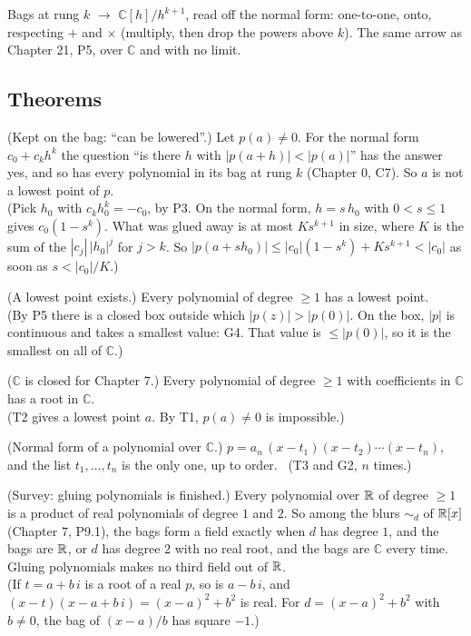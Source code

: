 \begin{lines}
\item[\lab{P6}] Bags at rung $k$ $\to$ $\mathbb{C}[h]/h^{k+1}$, read off the normal form: one-to-one, onto, respecting $+$ and $\times$ (multiply, then drop the powers above $k$). The same arrow as Chapter 21, P5, over $\mathbb{C}$ and with no limit.
\end{lines}

\subsection*{Theorems}

\begin{lines}
\item[\lab{T1}] (Kept on the bag: ``can be lowered''.) Let $p(a) \neq 0$. For the normal form $c_0 + c_k h^k$ the question ``is there $h$ with $|p(a + h)| < |p(a)|$'' has the answer yes, and so has every polynomial in its bag at rung $k$ (Chapter 0, C7). So $a$ is not a lowest point of $p$. \\
(Pick $h_0$ with $c_k h_0^k = -c_0$, by P3. On the normal form, $h = s\,h_0$ with $0 < s \le 1$ gives $c_0(1 - s^k)$. What was glued away is at most $K s^{k+1}$ in size, where $K$ is the sum of the $|c_j|\,|h_0|^j$ for $j > k$. So $|p(a + s h_0)| \le |c_0|(1 - s^k) + K s^{k+1} < |c_0|$ as soon as $s < |c_0|/K$.)
\item[\lab{T2}] (A lowest point exists.) Every polynomial of degree $\ge 1$ has a lowest point. \\
(By P5 there is a closed box outside which $|p(z)| > |p(0)|$. On the box, $|p|$ is continuous and takes a smallest value: G4. That value is $\le |p(0)|$, so it is the smallest on all of $\mathbb{C}$.)
\item[\lab{T3}] ($\mathbb{C}$ is closed for Chapter 7.) Every polynomial of degree $\ge 1$ with coefficients in $\mathbb{C}$ has a root in $\mathbb{C}$. \\
(T2 gives a lowest point $a$. By T1, $p(a) \neq 0$ is impossible.)
\item[\lab{T4}] (Normal form of a polynomial over $\mathbb{C}$.) $p = a_n\,(x - t_1)(x - t_2)\cdots(x - t_n)$, and the list $t_1, \dots, t_n$ is the only one, up to order. \ (T3 and G2, $n$ times.)
\item[\lab{T5}] (Survey: gluing polynomials is finished.) Every polynomial over $\mathbb{R}$ of degree $\ge 1$ is a product of real polynomials of degree $1$ and $2$. So among the blurs $\sim_d$ of $\mathbb{R}[x]$ (Chapter 7, P9.1), the bags form a field exactly when $d$ has degree $1$, and the bags are $\mathbb{R}$, or $d$ has degree $2$ with no real root, and the bags are $\mathbb{C}$ every time. Gluing polynomials makes no third field out of $\mathbb{R}$. \\
(If $t = a + b\,i$ is a root of a real $p$, so is $a - b\,i$, and $(x - t)(x - a + b\,i) = (x - a)^2 + b^2$ is real. For $d = (x - a)^2 + b^2$ with $b \neq 0$, the bag of $(x - a)/b$ has square $-1$.)
\end{lines}

